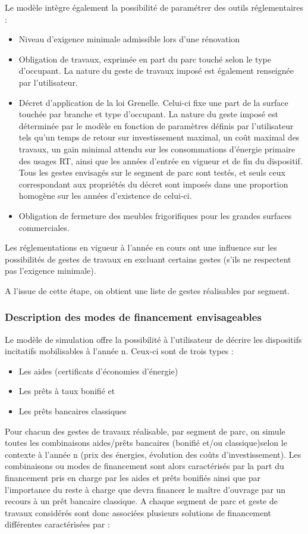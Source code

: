 \documentclass[10.5pt,a4paper]{article}
\begin{document}
{Le modèle intègre également la possibilité de paramétrer des outils réglementaires : 
\begin{itemize}
\item Niveau d’exigence minimale admissible lors d’une rénovation
\item	Obligation de travaux, exprimée en part du parc touché selon le type d’occupant. La nature du geste de travaux imposé est également renseignée par l’utilisateur.
\item	Décret d’application de la loi Grenelle. Celui-ci fixe une part de la surface touchée par branche et type d’occupant. La nature du geste imposé est déterminée par le modèle en fonction de paramètres définis par l’utilisateur tels qu’un temps de retour sur investissement maximal, un coût maximal des travaux, un gain minimal attendu sur les consommations d’énergie primaire des usages RT, ainsi que les années d’entrée en vigueur et de fin du dispositif. Tous les gestes envisagés sur le segment de parc sont testés, et seuls ceux correspondant aux propriétés du décret sont imposés dans une proportion homogène sur les années d’existence de celui-ci.
\item	Obligation de fermeture des meubles frigorifiques pour les grandes surfaces commerciales.
\end{itemize}

Les réglementations en vigueur à l’année en cours ont une influence sur les possibilités de gestes de travaux en excluant certains gestes (s’ils ne respectent pas l’exigence minimale).

A l'issue de cette étape, on obtient une liste de gestes réalisables par segment.

\subsubsection{Description des modes de financement envisageables}

Le modèle de simulation offre la possibilité à l’utilisateur de décrire les dispositifs incitatifs mobilisables à l’année n. Ceux-ci sont de trois types : 

\begin{itemize} 
\item Les aides (certificats d’économies d’énergie)
\item Les prêts à taux bonifié et 
\item Les prêts bancaires classiques
\end{itemize}

Pour chacun des gestes de travaux réalisable, par segment de parc, on simule toutes les combinaisons aides/prêts bancaires (bonifié et/ou classique)selon le contexte à l’année n (prix des énergies, évolution des coûts d'investissement). Les combinaisons ou modes de financement sont alors caractérisés par la part du financement pris en charge par les aides et prêts bonifiés ainsi que par l’importance du reste à charge que devra financer le maître d’ouvrage par un recours à un prêt bancaire classique.
A chaque segment de parc et geste de travaux considérés sont donc associées plusieurs solutions de financement différentes caractérisées par : 

}
\end{document}
